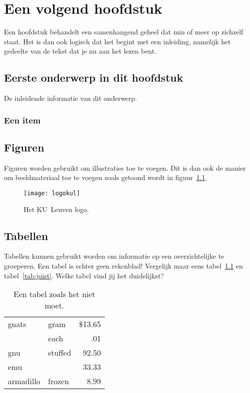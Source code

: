 \chapter{Een volgend hoofdstuk}
\label{hoofdstuk:2}
Een hoofdstuk behandelt een samenhangend geheel dat min of meer op zichzelf
staat. Het is dan ook logisch dat het begint met een inleiding, namelijk
het gedeelte van de tekst dat je nu aan het lezen bent.

\section{Eerste onderwerp in dit hoofdstuk}
De inleidende informatie van dit onderwerp.

\subsection{Een item}

\section{Figuren}
Figuren worden gebruikt om illustraties toe te voegen. Dit is dan ook de
manier om beeldmateriaal toe te voegen zoals getoond wordt in
figuur~\ref{fig:logo}.

\begin{figure}
  \centering
  \texttt{[image: logokul]}
  \caption{Het KU~Leuven logo.}
  \label{fig:logo}
\end{figure}

\section{Tabellen}
Tabellen kunnen gebruikt worden om informatie op een overzichtelijke te
groeperen. Een tabel is echter geen rekenblad! Vergelijk maar eens
tabel~\ref{tab:verkeerd} en tabel~\ref{tab:juist}. Welke tabel vind jij het
duidelijkst?

\begin{table}
  \centering
  \begin{tabular}{||l|lr||} \hline
    gnats     & gram      & \$13.65 \\ \cline{2-3}
              & each      & .01 \\ \hline
    gnu       & stuffed   & 92.50 \\ \cline{1-1} \cline{3-3}
    emu       &           & 33.33 \\ \hline
    armadillo & frozen    & 8.99 \\ \hline
  \end{tabular}
  \caption{Een tabel zoals het niet moet.}
  \label{tab:verkeerd}
\end{table}

